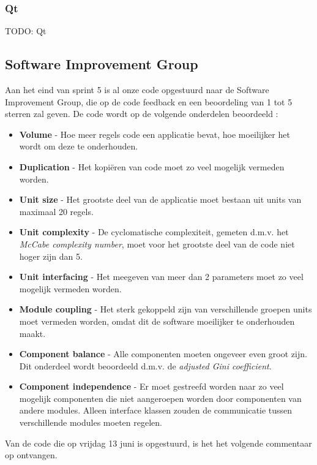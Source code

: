 \subsubsection{Qt}
TODO: Qt

\subsection{Software Improvement Group}

Aan het eind van sprint 5 is al onze code opgestuurd naar de Software Improvement Group, die op de code feedback en een beoordeling van 1 tot 5 sterren zal geven. De code wordt op de volgende onderdelen beoordeeld \cite{sigmanual}:
\begin{itemize}
\item \textbf{Volume} - Hoe meer regels code een applicatie bevat, hoe moeilijker het wordt om deze te onderhouden.
\item \textbf{Duplication} - Het kopi\"eren van code moet zo veel mogelijk vermeden worden.
\item \textbf{Unit size} - Het grootste deel van de applicatie moet bestaan uit units van maximaal 20 regels.
\item \textbf{Unit complexity} - De cyclomatische complexiteit, gemeten d.m.v. het \emph{McCabe complexity number}, moet voor het grootste deel van de code niet hoger zijn dan 5.
\item \textbf{Unit interfacing} - Het meegeven van meer dan 2 parameters moet zo veel mogelijk vermeden worden.
\item \textbf{Module coupling} - Het sterk gekoppeld zijn van verschillende groepen units moet vermeden worden, omdat dit de software moeilijker te onderhouden maakt.
\item \textbf{Component balance} - Alle componenten moeten ongeveer even groot zijn. Dit onderdeel wordt beoordeeld d.m.v. de \emph{adjusted Gini coefficient}.
\item \textbf{Component independence} - Er moet gestreefd worden naar zo veel mogelijk componenten die niet aangeroepen worden door componenten van andere modules. Alleen interface klassen zouden de communicatie tussen verschillende modules moeten regelen.
\end{itemize}

Van de code die op vrijdag 13 juni is opgestuurd, is het het volgende commentaar op ontvangen.

